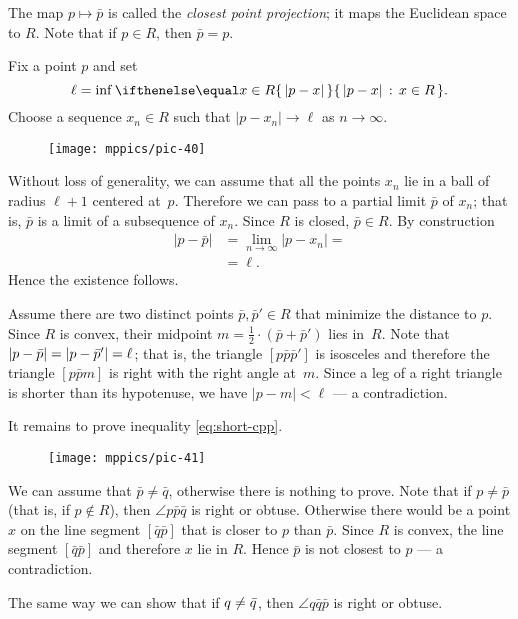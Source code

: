 The map $p\mapsto \bar p$ is called the \emph{closest point projection};
it maps the Euclidean space to $R$.
Note that if $p\in R$, then $\bar p=p$.

Fix a point $p$ and set 
\[\ell=\inf\set{|p-x|}{x\in R}.\]
Choose a sequence $x_n\in R$ such that $|p-x_n|\to \ell$ as $n\to\infty$.

\begin{wrapfigure}{o}{22 mm}
\vskip-0mm
\centering
\texttt{[image: mppics/pic-40]}
\vskip-0mm
\end{wrapfigure}

Without loss of generality, we can assume that all the points $x_n$ lie in a ball of radius $\ell+1$ centered at~$p$.
Therefore we can pass to a partial limit $\bar p$ of $x_n$; that is, $\bar p$ is a limit of a subsequence of $x_n$.
Since $R$ is closed, $\bar p\in R$.
By construction 
\begin{align*}
|p-\bar p|&=\lim_{n\to\infty}|p-x_n|=
\\
&=\ell.
\end{align*}
Hence the existence follows.

Assume there are two distinct points $\bar p, \bar p'\in R$ that minimize the distance to $p$.
Since $R$ is convex, their midpoint $m=\tfrac12\cdot (\bar p+\bar p')$ lies in~$R$.
Note that $|p-\bar p|\z=|p-\bar p'|=\ell$; that is, the triangle $[p\bar p\bar p']$ is isosceles and therefore the triangle $[p\bar p m]$ is right with the right angle at~$m$.
Since a leg of a right triangle is shorter than its hypotenuse, we have $|p-m|<\ell$ --- a contradiction. 

It remains to prove inequality \ref{eq:short-cpp}.

\begin{wrapfigure}{o}{37 mm}
\vskip-0mm
\centering
\texttt{[image: mppics/pic-41]}
\vskip-0mm
\end{wrapfigure}

We can assume that $\bar p\ne\bar q$, otherwise there is nothing to prove.
Note that if $p\ne \bar p$ (that is, if $p\notin R$), 
then $\angle p \bar p \bar q$ is right or obtuse.
Otherwise there would be a point $x$ on the line segment $[\bar q\bar p]$ that is closer to $p$ than $\bar p$.
Since $R$ is convex, the line segment $[\bar q\bar p]$ and therefore $x$ lie in $R$.
Hence $\bar p$ is not closest to $p$ --- a contradiction.

The same way we can show that  if $q\z\ne \bar q$, then $\angle q \bar q \bar p$ is right or obtuse.

